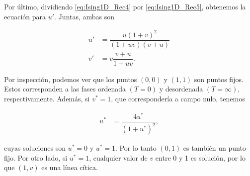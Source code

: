 \documentclass[10pt]{article}
\begin{document}
Por \'ultimo, dividiendo \ref{eq:Ising1D_Rec4} por \ref{eq:Ising1D_Rec5}, obtenemos la ecuaci\'on para $u'$. Juntas, ambas son

\begin{align}
u' &= \dfrac{u (1+v)^2}{(1+uv)(v+u)} \\
v' &= v \dfrac{v+u}{1+uv}.
\end{align}

Por inspecci\'on, podemos ver que los puntos $(0,0)$ y $(1,1)$ son puntos fijos. Estos corresponden a las fases ordenada $(T = 0)$ y desordenada $(T = \infty)$, respectivamente. Adem\'as, si $v^*=1$, que corresponder\'ia a campo nulo, tenemos

\begin{align}
u^* &= \dfrac{4u^*}{(1+u^*)^2},
\end{align}

cuyas soluciones son $u^* = 0$ y $u^* = 1$. Por lo tanto $(0,1)$ es tambi\'en un punto fijo. Por otro lado, si $u^* = 1$, cualquier valor de $v$ entre 0 y 1 es soluci\'on, por lo que $(1,v)$ es una l\'inea c\'itica.
\end{document}
